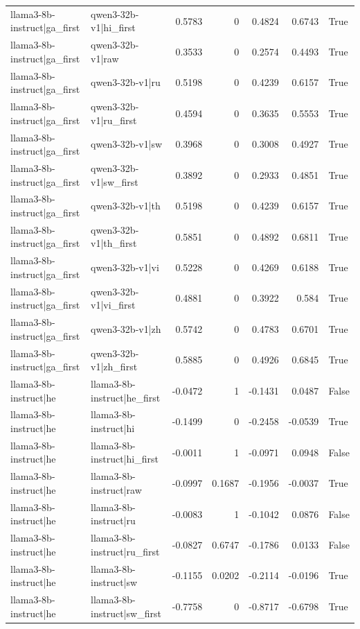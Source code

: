\begin{table}
\begin{tabular}{l l r r r r l}
llama3-8b-instruct|ga_first & qwen3-32b-v1|hi_first & 0.5783 & 0 & 0.4824 & 0.6743 & True \\
llama3-8b-instruct|ga_first & qwen3-32b-v1|raw & 0.3533 & 0 & 0.2574 & 0.4493 & True \\
llama3-8b-instruct|ga_first & qwen3-32b-v1|ru & 0.5198 & 0 & 0.4239 & 0.6157 & True \\
llama3-8b-instruct|ga_first & qwen3-32b-v1|ru_first & 0.4594 & 0 & 0.3635 & 0.5553 & True \\
llama3-8b-instruct|ga_first & qwen3-32b-v1|sw & 0.3968 & 0 & 0.3008 & 0.4927 & True \\
llama3-8b-instruct|ga_first & qwen3-32b-v1|sw_first & 0.3892 & 0 & 0.2933 & 0.4851 & True \\
llama3-8b-instruct|ga_first & qwen3-32b-v1|th & 0.5198 & 0 & 0.4239 & 0.6157 & True \\
llama3-8b-instruct|ga_first & qwen3-32b-v1|th_first & 0.5851 & 0 & 0.4892 & 0.6811 & True \\
llama3-8b-instruct|ga_first & qwen3-32b-v1|vi & 0.5228 & 0 & 0.4269 & 0.6188 & True \\
llama3-8b-instruct|ga_first & qwen3-32b-v1|vi_first & 0.4881 & 0 & 0.3922 & 0.584 & True \\
llama3-8b-instruct|ga_first & qwen3-32b-v1|zh & 0.5742 & 0 & 0.4783 & 0.6701 & True \\
llama3-8b-instruct|ga_first & qwen3-32b-v1|zh_first & 0.5885 & 0 & 0.4926 & 0.6845 & True \\
llama3-8b-instruct|he & llama3-8b-instruct|he_first & -0.0472 & 1 & -0.1431 & 0.0487 & False \\
llama3-8b-instruct|he & llama3-8b-instruct|hi & -0.1499 & 0 & -0.2458 & -0.0539 & True \\
llama3-8b-instruct|he & llama3-8b-instruct|hi_first & -0.0011 & 1 & -0.0971 & 0.0948 & False \\
llama3-8b-instruct|he & llama3-8b-instruct|raw & -0.0997 & 0.1687 & -0.1956 & -0.0037 & True \\
llama3-8b-instruct|he & llama3-8b-instruct|ru & -0.0083 & 1 & -0.1042 & 0.0876 & False \\
llama3-8b-instruct|he & llama3-8b-instruct|ru_first & -0.0827 & 0.6747 & -0.1786 & 0.0133 & False \\
llama3-8b-instruct|he & llama3-8b-instruct|sw & -0.1155 & 0.0202 & -0.2114 & -0.0196 & True \\
llama3-8b-instruct|he & llama3-8b-instruct|sw_first & -0.7758 & 0 & -0.8717 & -0.6798 & True \\

\end{tabular}
\end{table}
